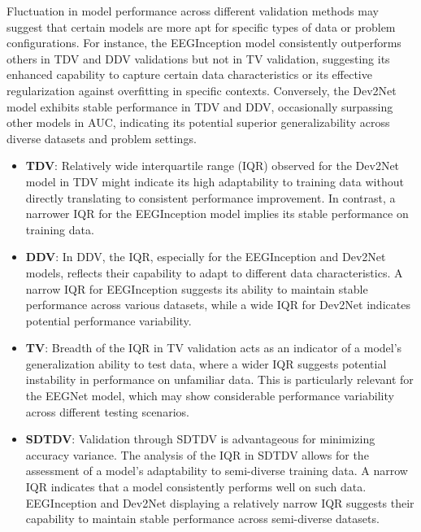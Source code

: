     Fluctuation in model performance across different validation methods may suggest that certain models are more apt for specific types of data or problem configurations. For instance, the EEGInception model consistently outperforms others in TDV and DDV validations but not in TV validation, suggesting its enhanced capability to capture certain data characteristics or its effective regularization against overfitting in specific contexts. Conversely, the Dev2Net model exhibits stable performance in TDV and DDV, occasionally surpassing other models in AUC, indicating its potential superior generalizability across diverse datasets and problem settings.
    \begin{itemize}
        \vspace{1mm}
        \item \textbf{TDV}: Relatively wide interquartile range (IQR) observed for the Dev2Net model in TDV might indicate its high adaptability to training data without directly translating to consistent performance improvement. In contrast, a narrower IQR for the EEGInception model implies its stable performance on training data.
        \vspace{3mm}
        \item \textbf{DDV}: In DDV, the IQR, especially for the EEGInception and Dev2Net models, reflects their capability to adapt to different data characteristics. A narrow IQR for EEGInception suggests its ability to maintain stable performance across various datasets, while a wide IQR for Dev2Net indicates potential performance variability.
        \vspace{3mm}
        \item \textbf{TV}: Breadth of the IQR in TV validation acts as an indicator of a model's generalization ability to test data, where a wider IQR suggests potential instability in performance on unfamiliar data. This is particularly relevant for the EEGNet model, which may show considerable performance variability across different testing scenarios.
        \vspace{3mm}
        \item \textbf{SDTDV}: Validation through SDTDV is advantageous for minimizing accuracy variance. The analysis of the IQR in SDTDV allows for the assessment of a model's adaptability to semi-diverse training data. A narrow IQR indicates that a model consistently performs well on such data. EEGInception and Dev2Net displaying a relatively narrow IQR suggests their capability to maintain stable performance across semi-diverse datasets.
    \end{itemize}
    \vspace{1mm}
    
